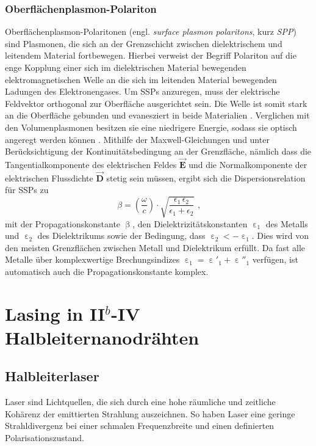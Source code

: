 \subsubsection{Oberflächenplasmon-Polariton} Oberflächenplasmon-Polaritonen
(engl. \textit{surface plasmon polaritons}, kurz \textit{SPP}) sind Plasmonen,
die sich an der Grenzschicht zwischen dielektrischem und leitendem Material
fortbewegen. Hierbei verweist der Begriff Polariton auf die enge Kopplung einer
sich im dielektrischen Material bewegenden elektromagnetischen Welle an die sich
im leitenden Material bewegenden Ladungen des Elektronengases. Um SSPs
anzuregen, muss der elektrische Feldvektor orthogonal zur Oberfläche
ausgerichtet sein. Die Welle ist somit stark an die Oberfläche gebunden und
evanesziert in beide Materialien \cite{Roeder.Diss}. Verglichen mit den
Volumenplasmonen besitzen sie eine niedrigere Energie, sodass sie optisch
angeregt werden können \cite{Maier.2010}. Mithilfe der Maxwell-Gleichungen und
unter Berücksichtigung der Kontinuitätsbedingung an der Grenzfläche, nämlich
dass die Tangentialkomponente des elektrischen Feldes $\vec{\textbf{E}}$ und die
Normalkomponente der elektrischen Flussdichte $\vec{\textbf{D}}$ stetig sein
müssen, ergibt sich die Dispersionsrelation für SSPs zu \begin{equation}
\beta=\left(\frac{\omega}{c}\right)\cdot \sqrt{\frac{\epsilon_1 \,
\epsilon_2}{\epsilon_1+\epsilon_2}} \text{ ,} \end{equation} mit der
Propagationskonstante $\upbeta$, den Dielektrizitätskonstanten
$\upepsilon_\text{1}$ des Metalls und $\upepsilon_\text{2}$ des Dielektrikums
sowie der Bedingung, dass $\upepsilon_\text{2}<-\upepsilon_\text{1}$. Dies wird
von den meisten Grenzflächen zwischen Metall und Dielektrikum erfüllt. Da fast
alle Metalle über komplexwertige Brechungsindizes
$\upepsilon_\text{1}=\upepsilon'_\text{1}+\upepsilon''_\text{1}$ verfügen, ist
automatisch auch die Propagationskonstante komplex. \section{Lasing in II$^b$-IV
Halbleiternanodrähten} \subsection{Halbleiterlaser} \label{HLLaser} Laser sind
Lichtquellen, die sich durch eine hohe räumliche und zeitliche Kohärenz der
emittierten Strahlung auszeichnen. So haben Laser eine geringe Strahldivergenz
bei einer schmalen Frequenzbreite und einen definierten Polarisationszustand.
